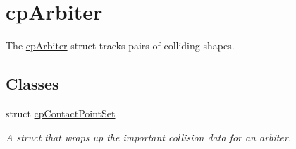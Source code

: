 \hypertarget{group__cp_arbiter}{}\section{cp\+Arbiter}
\label{group__cp_arbiter}


The \hyperlink{structcp_arbiter}{cp\+Arbiter} struct tracks pairs of colliding shapes.  


\subsection*{Classes}
\begin{DoxyCompactItemize}
\item 
struct \hyperlink{structcp_contact_point_set}{cp\+Contact\+Point\+Set}
\begin{DoxyCompactList}\small\item\em A struct that wraps up the important collision data for an arbiter. \end{DoxyCompactList}\end{DoxyCompactItemize}
